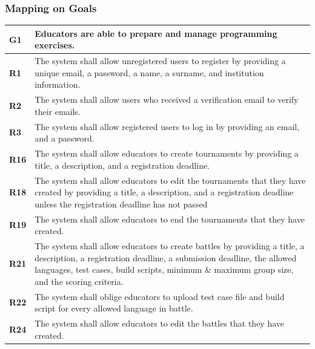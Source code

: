 \newpage

\subsubsection{Mapping on Goals}

\begin{table}[h!]
  \centering
  \begin{tabular}{lp{15cm}}
    \hline
    \textbf{G1} & Educators are able to prepare and manage programming exercises. \\
    \hline
    \hline
    \textbf{R1} & The system shall allow unregistered users to register by providing a unique email, a password, a name, a surname, and institution information. \\

    \textbf{R2} & The system shall allow users who received a verification email to verify their emails. \\

    \textbf{R3} & The system shall allow registered users to log in by providing an email, and a password. \\

    \textbf{R16} & The system shall allow educators to create tournaments by providing a title, a description, and a registration deadline. \\

    \textbf{R18} & The system shall allow educators to edit the tournaments that they have created by providing a title, a description, and a registration deadline unless the registration deadline has not passed \\

    \textbf{R19} & The system shall allow educators to end the tournaments that they have created. \\

    \textbf{R21} & The system shall allow educators to create battles by providing a title, a description, a registration deadline, a submission deadline, the allowed languages, test cases, build scripts, minimum \& maximum group size, and the scoring criteria. \\

    \textbf{R22} & The system shall oblige educators to upload test case file and build script for every allowed language in battle. \\

    \textbf{R24} & The system shall allow educators to edit the battles that they have created. \\


\end{tabular}
\end{table}
